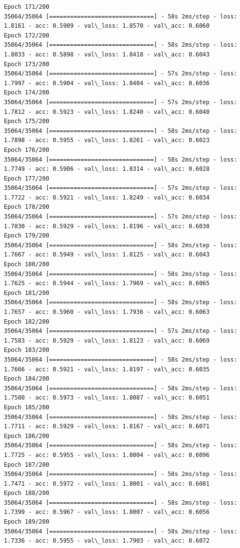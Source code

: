 \documentclass[11pt]{article}
\begin{document}
\begin{Verbatim}[commandchars=\\\{\}]
Epoch 171/200
35064/35064 [==============================] - 58s 2ms/step - loss: 1.8161 - acc: 0.5909 - val\_loss: 1.8570 - val\_acc: 0.6060
Epoch 172/200
35064/35064 [==============================] - 58s 2ms/step - loss: 1.8033 - acc: 0.5898 - val\_loss: 1.8418 - val\_acc: 0.6043
Epoch 173/200
35064/35064 [==============================] - 57s 2ms/step - loss: 1.7997 - acc: 0.5904 - val\_loss: 1.8404 - val\_acc: 0.6036
Epoch 174/200
35064/35064 [==============================] - 57s 2ms/step - loss: 1.7812 - acc: 0.5923 - val\_loss: 1.8240 - val\_acc: 0.6040
Epoch 175/200
35064/35064 [==============================] - 58s 2ms/step - loss: 1.7898 - acc: 0.5955 - val\_loss: 1.8261 - val\_acc: 0.6023
Epoch 176/200
35064/35064 [==============================] - 58s 2ms/step - loss: 1.7749 - acc: 0.5906 - val\_loss: 1.8314 - val\_acc: 0.6028
Epoch 177/200
35064/35064 [==============================] - 57s 2ms/step - loss: 1.7722 - acc: 0.5921 - val\_loss: 1.8249 - val\_acc: 0.6034
Epoch 178/200
35064/35064 [==============================] - 57s 2ms/step - loss: 1.7830 - acc: 0.5929 - val\_loss: 1.8196 - val\_acc: 0.6038
Epoch 179/200
35064/35064 [==============================] - 58s 2ms/step - loss: 1.7667 - acc: 0.5949 - val\_loss: 1.8125 - val\_acc: 0.6043
Epoch 180/200
35064/35064 [==============================] - 58s 2ms/step - loss: 1.7625 - acc: 0.5944 - val\_loss: 1.7969 - val\_acc: 0.6065
Epoch 181/200
35064/35064 [==============================] - 58s 2ms/step - loss: 1.7657 - acc: 0.5960 - val\_loss: 1.7936 - val\_acc: 0.6063
Epoch 182/200
35064/35064 [==============================] - 57s 2ms/step - loss: 1.7583 - acc: 0.5929 - val\_loss: 1.8123 - val\_acc: 0.6069
Epoch 183/200
35064/35064 [==============================] - 58s 2ms/step - loss: 1.7666 - acc: 0.5921 - val\_loss: 1.8197 - val\_acc: 0.6035
Epoch 184/200
35064/35064 [==============================] - 58s 2ms/step - loss: 1.7580 - acc: 0.5973 - val\_loss: 1.8087 - val\_acc: 0.6051
Epoch 185/200
35064/35064 [==============================] - 58s 2ms/step - loss: 1.7711 - acc: 0.5929 - val\_loss: 1.8167 - val\_acc: 0.6071
Epoch 186/200
35064/35064 [==============================] - 58s 2ms/step - loss: 1.7725 - acc: 0.5955 - val\_loss: 1.8004 - val\_acc: 0.6096
Epoch 187/200
35064/35064 [==============================] - 58s 2ms/step - loss: 1.7471 - acc: 0.5972 - val\_loss: 1.8001 - val\_acc: 0.6081
Epoch 188/200
35064/35064 [==============================] - 58s 2ms/step - loss: 1.7399 - acc: 0.5967 - val\_loss: 1.8007 - val\_acc: 0.6056
Epoch 189/200
35064/35064 [==============================] - 58s 2ms/step - loss: 1.7336 - acc: 0.5955 - val\_loss: 1.7903 - val\_acc: 0.6072

\end{Verbatim}
\end{document}
